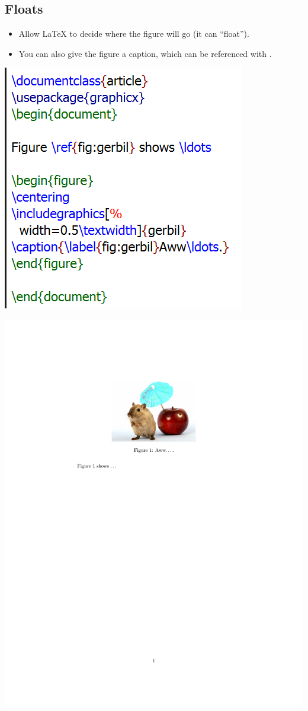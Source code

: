 \documentclass[aspectratio=169]{beamer}
\begin{document}
\subsection[fragile]{Floats}
\begin{frame}{\insertsubsection}
\begin{itemize}
\item Allow \LaTeX{} to decide where the figure will go (it can ``float'').
\item You can also give the figure a caption, which can be referenced with
.
\end{itemize}
\begin{minipage}{0.55\linewidth}
    \includegraphics[width=0.5\linewidth]{figs/float_basic.png}
\end{minipage}
\begin{minipage}{0.35\linewidth}
    \includegraphics[width=\textwidth,clip,trim=2in 5in 3in 1in]{figs/media-graphics.pdf}
\end{minipage}


\end{frame}
\end{document}
